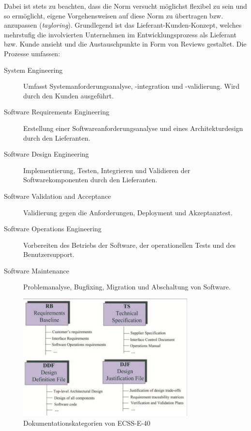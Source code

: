 Dabei ist stets zu beachten, dass die Norm versucht möglichst flexibel zu sein und so ermöglicht, eigene Vorgehensweisen auf diese Norm zu übertragen bzw. anzupassen (\emph{tayloring}).
Grundlegend ist das Lieferant-Kunden-Konzept, welches mehrstufig die involvierten Unternehmen im Entwicklungsprozess als Lieferant bzw. Kunde ansieht und die Austauschpunkte in Form von Reviews gestaltet.
Die Prozesse umfassen:
\begin{description}
\item[System Engineering] Umfasst Systemanforderungsanalyse, -integration und -validierung. 
Wird durch den Kunden ausgeführt.
\item[Software Requirements Engineering] Erstellung einer Softwareanforderungsanalyse und eines Architekturdesign durch den Lieferanten.
\item[Software Design Engineering] Implementierung, Testen, Integrieren und Validieren der Softwarekomponenten durch den Lieferanten.
\item[Software Validation and Acceptance] Validierung gegen die Anforderungen, Deployment und Akzeptanztest.
\item[Software Operations Engineering] Vorbereiten des Betriebs der Software, der operationellen Tests und des Benutzersupport.
\item[Software Maintenance] Problemanalyse, Bugfixing, Migration und Abschaltung von Software.
\end{description}

\begin{figure}
  \centering
  \includegraphics[width=0.8\textwidth]{img/ecss-dokumentation.png}
  \caption{Dokumentationskategorien von ECSS-E-40 \parencite[][S. 136]{jones2002introducing}}
  \label{fig:ecss-dok}
\end{figure}

